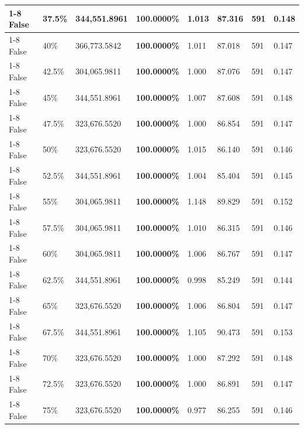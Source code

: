 \begin{table}[H]
\begin{tabular}{lllrllll}
\cline{1-8} \cline{2-8}
False & 37.5\% & 344,551.8961 & \bfseries \color{red} 100.0000\% & 1.013 & 87.316 & 591 & 0.148 \\
\cline{1-8} \cline{2-8}
False & 40\% & 366,773.5842 & \bfseries \color{red} 100.0000\% & 1.011 & 87.018 & 591 & 0.147 \\
\cline{1-8} \cline{2-8}
False & 42.5\% & \color{red} 304,065.9811 & \bfseries \color{red} 100.0000\% & 1.000 & 87.076 & 591 & 0.147 \\
\cline{1-8} \cline{2-8}
False & 45\% & 344,551.8961 & \bfseries \color{red} 100.0000\% & 1.007 & 87.608 & 591 & 0.148 \\
\cline{1-8} \cline{2-8}
False & 47.5\% & 323,676.5520 & \bfseries \color{red} 100.0000\% & 1.000 & 86.854 & 591 & 0.147 \\
\cline{1-8} \cline{2-8}
False & 50\% & 323,676.5520 & \bfseries \color{red} 100.0000\% & 1.015 & 86.140 & 591 & 0.146 \\
\cline{1-8} \cline{2-8}
False & 52.5\% & 344,551.8961 & \bfseries \color{red} 100.0000\% & 1.004 & 85.404 & 591 & 0.145 \\
\cline{1-8} \cline{2-8}
False & 55\% & \color{red} 304,065.9811 & \bfseries \color{red} 100.0000\% & 1.148 & 89.829 & 591 & 0.152 \\
\cline{1-8} \cline{2-8}
False & 57.5\% & \color{red} 304,065.9811 & \bfseries \color{red} 100.0000\% & 1.010 & 86.315 & 591 & 0.146 \\
\cline{1-8} \cline{2-8}
False & 60\% & \color{red} 304,065.9811 & \bfseries \color{red} 100.0000\% & 1.006 & 86.767 & 591 & 0.147 \\
\cline{1-8} \cline{2-8}
False & 62.5\% & 344,551.8961 & \bfseries \color{red} 100.0000\% & 0.998 & 85.249 & 591 & 0.144 \\
\cline{1-8} \cline{2-8}
False & 65\% & 323,676.5520 & \bfseries \color{red} 100.0000\% & 1.006 & 86.804 & 591 & 0.147 \\
\cline{1-8} \cline{2-8}
False & 67.5\% & 344,551.8961 & \bfseries \color{red} 100.0000\% & 1.105 & 90.473 & 591 & 0.153 \\
\cline{1-8} \cline{2-8}
False & 70\% & 323,676.5520 & \bfseries \color{red} 100.0000\% & 1.000 & 87.292 & 591 & 0.148 \\
\cline{1-8} \cline{2-8}
False & 72.5\% & 323,676.5520 & \bfseries \color{red} 100.0000\% & 1.000 & 86.891 & 591 & 0.147 \\
\cline{1-8} \cline{2-8}
False & 75\% & 323,676.5520 & \bfseries \color{red} 100.0000\% & 0.977 & 86.255 & 591 & 0.146 \\

\end{tabular}
\end{table}
